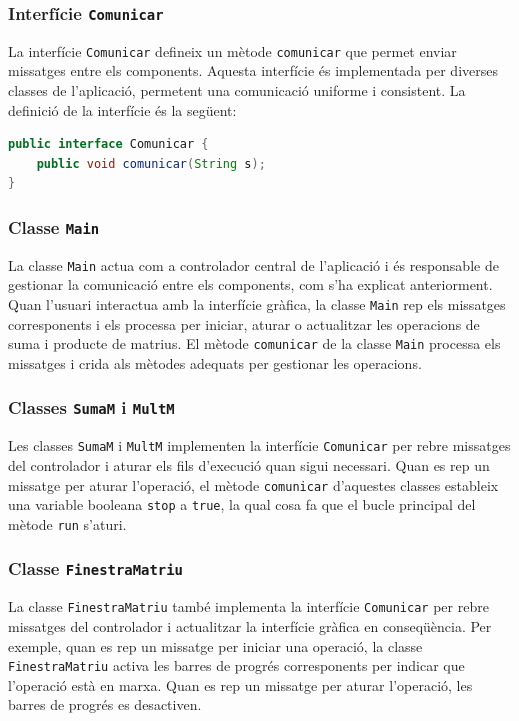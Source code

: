 \documentclass{ieeetj}
\begin{document}
\subsubsection{Interfície \texttt{Comunicar}}
La interfície \texttt{Comunicar} defineix un mètode \texttt{comunicar} que permet enviar missatges entre els components. Aquesta interfície és implementada per diverses classes de l'aplicació, permetent una comunicació uniforme i consistent. La definició de la interfície és la següent:

\begin{lstlisting}[language=Java, basicstyle=\ttfamily\normalsize]
public interface Comunicar {
    public void comunicar(String s);
}
\end{lstlisting}

\subsubsection{Classe \texttt{Main}}
La classe \texttt{Main} actua com a controlador central de l'aplicació i és responsable de gestionar la comunicació entre els components, com s'ha explicat anteriorment. Quan l'usuari interactua amb la interfície gràfica, la classe \texttt{Main} rep els missatges corresponents i els processa per iniciar, aturar o actualitzar les operacions de suma i producte de matrius. El mètode \texttt{comunicar} de la classe \texttt{Main} processa els missatges i crida als mètodes adequats per gestionar les operacions.

\subsubsection{Classes \texttt{SumaM} i \texttt{MultM}}
Les classes \texttt{SumaM} i \texttt{MultM} implementen la interfície \texttt{Comunicar} per rebre missatges del controlador i aturar els fils d'execució quan sigui necessari. Quan es rep un missatge per aturar l'operació, el mètode \texttt{comunicar} d'aquestes classes estableix una variable booleana \texttt{stop} a \texttt{true}, la qual cosa fa que el bucle principal del mètode \texttt{run} s'aturi.

\subsubsection{Classe \texttt{FinestraMatriu}}
La classe \texttt{FinestraMatriu} també implementa la interfície \texttt{Comunicar} per rebre missatges del controlador i actualitzar la interfície gràfica en conseqüència. Per exemple, quan es rep un missatge per iniciar una operació, la classe \texttt{FinestraMatriu} activa les barres de progrés corresponents per indicar que l'operació està en marxa. Quan es rep un missatge per aturar l'operació, les barres de progrés es desactiven.
\end{document}
